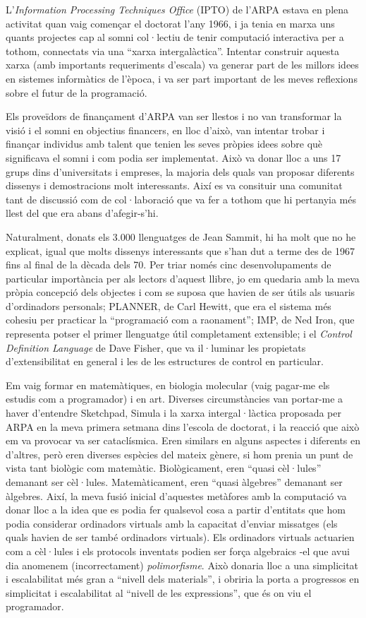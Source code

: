 L'\emph{Information Processing Techniques Office} (IPTO) de l'ARPA estava en plena activitat quan vaig començar el doctorat l'any 1966, i ja tenia en marxa uns quants projectes cap al somni col·lectiu de tenir computació interactiva per a tothom, connectats via una ``xarxa intergalàctica''. Intentar construir aquesta xarxa (amb importants requeriments d'escala) va generar part de les millors idees en sistemes informàtics de l'època, i va ser part important de les meves reflexions sobre el futur de la programació.

Els proveïdors de finançament d'ARPA van ser llestos i no van transformar la visió i el somni en objectius financers, en lloc d'això, van intentar trobar i finançar individus amb talent que tenien les seves pròpies idees sobre què significava el somni i com podia ser implementat. Això va donar lloc a uns 17 grups dins d'universitats i empreses, la majoria dels quals van proposar diferents dissenys i demostracions molt interessants. Així es va consituir una comunitat tant de discussió com de col·laboració que va fer a tothom que hi pertanyia més llest del que era abans d'afegir-s'hi.

Naturalment, donats els 3.000 llenguatges de Jean Sammit, hi ha molt que no he explicat, igual que molts dissenys interessants que s'han dut a terme des de 1967 fins al final de la dècada dels 70. Per triar només cinc desenvolupaments de particular importància per als lectors d'aquest llibre, jo em quedaria amb la meva pròpia concepció dels objectes i com se suposa que havien de ser útils als usuaris d'ordinadors personals; PLANNER, de Carl Hewitt, que era el sistema més cohesiu per practicar la ``programació com a raonament''; IMP, de Ned Iron, que representa potser el primer llenguatge útil completament extensible; i el \emph{Control Definition Language} de Dave Fisher, que va il·luminar les propietats d'extensibilitat en general i les de les estructures de control en particular.

Em vaig formar en matemàtiques, en biologia molecular (vaig pagar-me els estudis com a programador) i en art. Diverses circumstàncies van portar-me a haver d'entendre Sketchpad, Simula i la xarxa intergal·làctica proposada per ARPA en la meva primera setmana dins l'escola de doctorat, i la reacció que això em va provocar va ser cataclísmica. Eren similars en alguns aspectes i diferents en d'altres, però eren diverses espècies del mateix gènere, si hom prenia un punt de vista tant biològic com matemàtic. Biològicament, eren ``quasi cèl·lules'' demanant ser cèl·lules. Matemàticament, eren ``quasi àlgebres'' demanant ser àlgebres. Així, la meva fusió inicial d'aquestes metàfores amb la computació va donar lloc a la idea que es podia fer qualsevol cosa a partir d'entitats que hom podia considerar ordinadors virtuals amb la capacitat d'enviar missatges (els quals havien de ser també ordinadors virtuals). Els ordinadors virtuals actuarien com a cèl·lules i els protocols inventats podien ser força algebraics -el que avui dia anomenem (incorrectament) \emph{polimorfisme}. Això donaria lloc a una simplicitat i escalabilitat més gran a ``nivell dels materials'', i obriria la porta a progressos en simplicitat i escalabilitat al ``nivell de les expressions'', que és on viu el programador.

